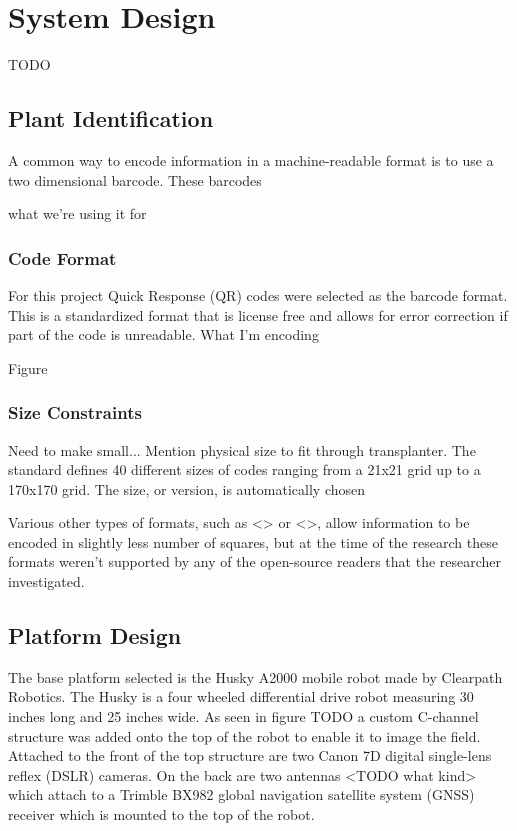 
\cleardoublepage

\chapter{System Design}
\label{system}

TODO

\section{Plant Identification}
\label{system-plantid}

A common way to encode information in a machine-readable format is to use a two dimensional barcode.  These barcodes 

what we're using it for

\subsection{Code Format}

For this project Quick Response (QR) codes were selected as the barcode format. This is a standardized format that is license free and allows for error correction if part of the code is unreadable.  What I'm encoding

Figure 

\subsection{Size Constraints}

Need to make small...  Mention physical size to fit through transplanter.
The standard defines 40 different sizes of codes ranging from a 21x21 grid up to a 170x170 grid.  The size, or version, is automatically chosen 

Various other types of formats, such as <> or <>, allow information to be encoded in slightly less number of squares, but at the time of the research these formats weren't supported by any of the open-source readers that the researcher investigated.  

\section{Platform Design}
\label{system-platform}

The base platform selected is the Husky A2000 mobile robot made by Clearpath Robotics.  The Husky is a four wheeled differential drive robot measuring 30 inches long and 25 inches wide.  As seen in figure TODO a custom C-channel structure was added onto the top of the robot to enable it to image the field.  Attached to the front of the top structure are two Canon 7D digital single-lens reflex (DSLR) cameras. On the back are two antennas <TODO what kind> which attach to a Trimble BX982 global navigation satellite system (GNSS) receiver which is mounted to the top of the robot.   

